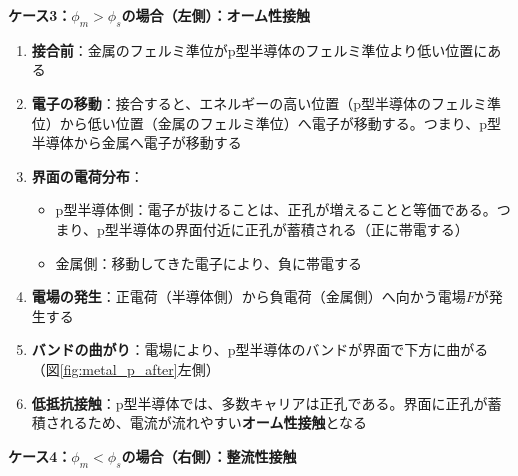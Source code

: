 \textbf{ケース3：$\phi_m > \phi_s$の場合（左側）：オーム性接触}

\begin{enumerate}
\item \textbf{接合前}：金属のフェルミ準位がp型半導体のフェルミ準位より低い位置にある

\item \textbf{電子の移動}：接合すると、エネルギーの高い位置（p型半導体のフェルミ準位）から低い位置（金属のフェルミ準位）へ電子が移動する。つまり、p型半導体から金属へ電子が移動する

\item \textbf{界面の電荷分布}：
\begin{itemize}
\item p型半導体側：電子が抜けることは、正孔が増えることと等価である。つまり、p型半導体の界面付近に正孔が蓄積される（正に帯電する）
\item 金属側：移動してきた電子により、負に帯電する
\end{itemize}

\item \textbf{電場の発生}：正電荷（半導体側）から負電荷（金属側）へ向かう電場$F$が発生する

\item \textbf{バンドの曲がり}：電場により、p型半導体のバンドが界面で下方に曲がる（図\ref{fig:metal_p_after}左側）

\item \textbf{低抵抗接触}：p型半導体では、多数キャリアは正孔である。界面に正孔が蓄積されるため、電流が流れやすい\textbf{オーム性接触}となる
\end{enumerate}

\textbf{ケース4：$\phi_m < \phi_s$の場合（右側）：整流性接触}

